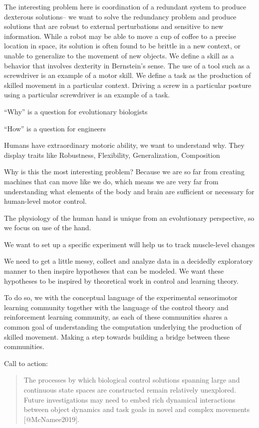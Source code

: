 \documentclass[../main.tex]{subfiles}
\begin{document}
The interesting problem here is coordination of a redundant system to produce dexterous solutions-- we want to solve the redundancy problem and produce solutions that are robust to external perturbations and sensitive to new information. While a robot may be able to move a cup of coffee to a precise location in space, its solution is often found to be brittle in a new context, or unable to generalize to the movement of new objects. We define a skill as a behavior that involves dexterity in Bernstein's sense. The use of a tool such as a screwdriver is an example of a motor skill. We define a task as the production of skilled movement in a particular context. Driving a screw in a particular posture using a particular screwdriver is an example of a task.

``Why'' is a question for evolutionary biologists

``How'' is a question for engineers

Humans have extraordinary motoric ability, we want to understand why. They display traits like Robustness, Flexibility, Generalization, Composition

Why is this the most interesting problem? Because we are so far from creating machines that can move like we do, which means we are very far from understanding what elements of the body and brain are sufficient or necessary for human-level motor control.

The physiology of the human hand is unique from an evolutionary perspective, so we focus on use of the hand.

We want to set up a specific experiment will help us to track muscle-level changes

We need to get a little messy, collect and analyze data in a decidedly exploratory manner to then inspire hypotheses that can be modeled. We want these hypotheses to be inspired by theoretical work in control and learning theory.

To do so, we with the conceptual language of the experimental sensorimotor learning community together with the language of the control theory and reinforcement learning community, as each of these communities shares a common goal of understanding the computation underlying the production of skilled movement. Making a step towards building a bridge between these communities.

Call to action:

\begin{quote}
  The processes by which biological control solutions spanning large and continuous state spaces are constructed remain relatively unexplored. Future investigations may need to embed rich dynamical interactions between object dynamics and task goals in novel and complex movements [@McNamee2019].
\end{quote}
\end{document}
